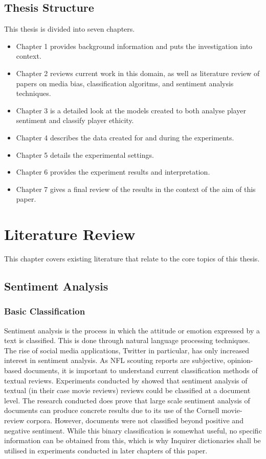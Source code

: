 \documentclass[oneside,12pt]{Classes/RoboticsLaTeX}
\begin{document}
\section{Thesis Structure}
This thesis is divided into seven chapters.
\begin{itemize}
  \item Chapter 1 provides background information and puts the investigation into context.
  \item Chapter 2 reviews current work in this domain, as well as literature review of papers on media bias, classification algoritms, and sentiment analysis techniques.
  \item Chapter 3 is a detailed look at the models created to both analyse player sentiment and classify player ethicity.
  \item Chapter 4 describes the data created for and during the experiments.
  \item Chapter 5 details the experimental settings.
  \item Chapter 6 provides the experiment results and interpretation.
  \item Chapter 7 gives a final review of the results in the context of the aim of this paper.
\end{itemize}


\chapter{Literature Review}
\label{chap:lit_review}
This chapter covers existing literature that relate to the core topics of this thesis.
\section{Sentiment Analysis}
\subsection{Basic Classification}
Sentiment analysis is the process in which the attitude or emotion expressed by a text is classified. This is done through natural language processing techniques. The rise of social media applications, Twitter in particular, 
has only increased interest in sentiment analysis. As NFL scouting reports are subjective, opinion-based documents, it is important to understand current classification methods of textual reviews. Experiments conducted by 
\citet{SentiAnalysis} showed that sentiment analysis of textual (in their case movie reviews) reviews could be classified at a document level. The research conducted does prove that large scale sentiment analysis of documents can
produce concrete results due to its use of the Cornell movie-review corpora. However, documents were not classified beyond positive and negative sentiment. While this binary classification is somewhat useful,
no specific information can be obtained from this, which is why Inquirer dictionaries shall be utilised in experiments conducted in later chapters of this paper.
\end{document}
